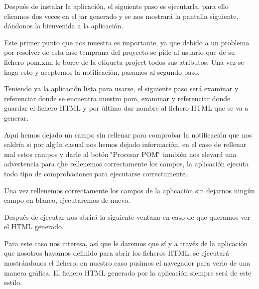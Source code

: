 \begin{DoxyEnumerate}
\item Después de instalar la aplicación, el siguiente paso es ejecutarla, para ello clicamos dos veces en el jar generado y se nos mostrará la pantalla siguiente, dándonos la bienvenida a la aplicación.
\end{DoxyEnumerate}



Este primer punto que nos muestra es importante, ya que debido a un problema por resolver de esta fase temprana del proyecto se pide al usuario que de su fichero pom.\+xml le borre de la etiqueta project todos sus atributos. Una vez se haga esto y aceptemos la notificación, pasamos al segundo paso.




\begin{DoxyEnumerate}
\item Teniendo ya la aplicación lista para usarse, el siguiente paso será examinar y referenciar donde se encuentra nuestro pom, examinar y referenciar donde guardar el fichero H\+T\+ML y por último dar nombre al fichero H\+T\+ML que se va a generar.
\end{DoxyEnumerate}





Aquí hemos dejado un campo sin rellenar para comprobar la notificación que nos saldría si por algún casual nos hemos dejado información, en el caso de rellenar mal estos campos y darle al botón \char`\"{}\+Procesar P\+O\+M\char`\"{} también nos elevará una advertencia para qhe rellenemos correctamente los campos, la aplicación ejecuta todo tipo de comprobaciones para ejecutarse correctamente.


\begin{DoxyEnumerate}
\item Una vez rellenemos correctamente los campos de la aplicación sin dejarnos ningún campo en blanco, ejecutaremos de nuevo.
\end{DoxyEnumerate}



Después de ejecutar nos abrirá la siguiente ventana en caso de que queramos ver el H\+T\+ML generado.



Para este caso nos interesa, así que le daremos que sí y a través de la aplicación que nosotros hayamos definido para abrir los ficheros H\+T\+ML, se ejecutará mostrándonos el fichero, en nuestro caso pusimos el navegador para verlo de una manera gráfica. El fichero H\+T\+ML generado por la aplicación siempre será de este estilo.



